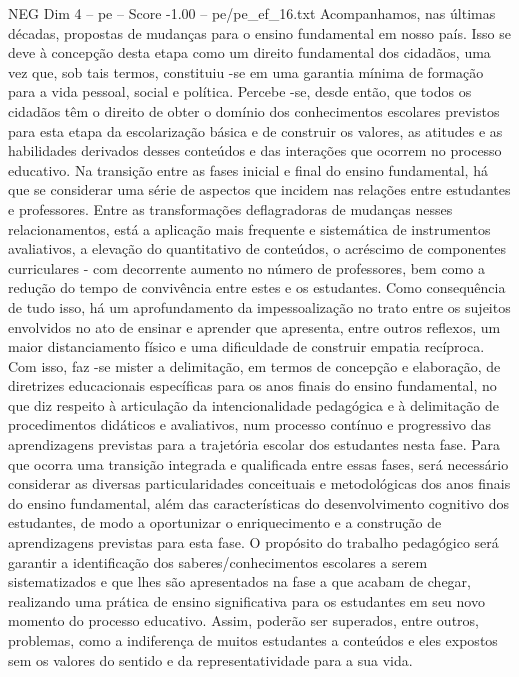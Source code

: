 \begin{textsample}{NEG Dim 4 – pe – Score -1.00 – pe/pe\_ef\_16.txt}
Acompanhamos, nas últimas décadas, propostas de mudanças para o ensino fundamental em nosso país.
Isso se deve à concepção desta etapa como um direito fundamental dos cidadãos, uma vez que, sob tais termos, constituiu -se em uma garantia mínima de formação para a vida pessoal, social e política.
Percebe -se, desde então, que todos os cidadãos têm o direito de obter o domínio dos conhecimentos escolares previstos para esta etapa da escolarização básica e de construir os valores, as atitudes e as habilidades derivados desses conteúdos e das interações que ocorrem no processo educativo.
Na transição entre as fases inicial e final do ensino fundamental, há que se considerar uma série de aspectos que incidem nas relações entre estudantes e professores.
Entre as transformações deflagradoras de mudanças nesses relacionamentos, está a aplicação mais frequente e sistemática de instrumentos avaliativos, a elevação do quantitativo de conteúdos, o acréscimo de componentes curriculares - com decorrente aumento no número de professores, bem como a redução do tempo de convivência entre estes e os estudantes.
Como consequência de tudo isso, há um aprofundamento da impessoalização no trato entre os sujeitos envolvidos no ato de ensinar e aprender que apresenta, entre outros reflexos, um maior distanciamento físico e uma dificuldade de construir empatia recíproca.
Com isso, faz -se mister a delimitação, em termos de concepção e elaboração, de diretrizes educacionais específicas para os anos finais do ensino fundamental, no que diz respeito à articulação da intencionalidade pedagógica e à delimitação de procedimentos didáticos e avaliativos, num processo contínuo e progressivo das aprendizagens previstas para a trajetória escolar dos estudantes nesta fase.
Para que ocorra uma transição integrada e qualificada entre essas fases, será necessário considerar as diversas particularidades conceituais e metodológicas dos anos finais do ensino fundamental, além das características do desenvolvimento cognitivo dos estudantes, de modo a oportunizar o enriquecimento e a construção de aprendizagens previstas para esta fase.
O propósito do trabalho pedagógico será garantir a identificação dos saberes/conhecimentos escolares a serem sistematizados e que lhes são apresentados na fase a que acabam de chegar, realizando uma prática de ensino significativa para os estudantes em seu novo momento do processo educativo.
Assim, poderão ser superados, entre outros, problemas, como a indiferença de muitos estudantes a conteúdos e eles expostos sem os valores do sentido e da representatividade para a sua vida.

\end{textsample}
